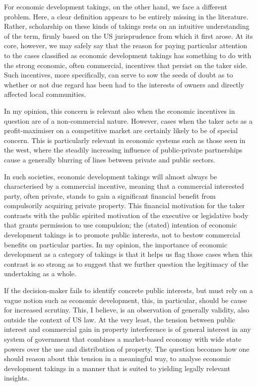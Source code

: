 \documentclass{article} %
\begin{document}
For economic development takings, on the other hand, we face a different problem. Here, a clear definition appears to be entirely missing in the literature. Rather, scholarship on these kinds of takings rests on an intuitive understanding of the term, firmly based on the US jurisprudence from which it first arose. At its core, however, we may safely say that the reason for paying particular attention to the cases classified as economic development takings has something to do with the strong economic, often commercial, incentives that persist on the taker side. Such incentives, more specifically, can serve to sow the seeds of doubt as to whether or not due regard has been had to the interests of owners and directly affected local communities.

In my opinion, this concern is relevant also when the economic incentives in question are of a non-commercial nature. However, cases when the taker acts as a profit-maximiser on a competitive market are certainly likely to be of special concern. This is particularly relevant in economic systems such as those seen in the west, where the steadily increasing influence of public-private partnerships cause a generally blurring of lines between private and public sectors. 

In such societies, economic development takings will almost always be characterised by a commercial incentive, meaning that a commercial interested party, often private, stands to gain a significant financial benefit from compulsorily acquiring private property. This financial motivation for the taker contrasts with the public spirited motivation of the executive or legislative body that grants permission to use compulsion; the (stated) intention of economic development takings is to promote public interests, not to bestow commercial benefits on particular parties. In my opinion, the  importance of economic development as a category of takings is that it helps us flag those cases when this contrast is so strong as to suggest that we further question the legitimacy of the undertaking as a whole.

If the decision-maker fails to identify concrete public interests, but must rely on a vague notion such as economic development, this, in particular, should be cause for increased scrutiny. This, I believe, is an observation of generally validity, also outside the context of US law. At the very least, the tension between public interest and commercial gain in property interference is of general interest in any system of government that combines a market-based economy with wide state powers over the use and distribution of property. The question becomes how one should reason about this tension in a meaningful way, to analyse economic development takings in a manner that is suited to yielding legally relevant insights.
\end{document}
